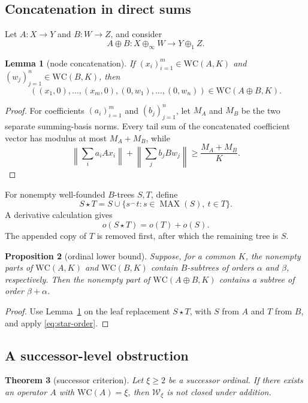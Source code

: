 \documentclass[11pt]{article}
\newtheorem{theorem}{Theorem}[section]
\newtheorem{proposition}[theorem]{Proposition}
\newtheorem{lemma}[theorem]{Lemma}
\theoremstyle{definition}
\theoremstyle{remark}
\newcommand{\WC}{\mathrm{WC}}
\newcommand{\MAX}{\operatorname{MAX}}
\newcommand{\cW}{\mathcal W}
\begin{document}
\subsection{Concatenation in direct sums}

Let $A:X\to Y$ and $B:W\to Z$, and consider
\[
   A\oplus B:X\oplus_\infty W\longrightarrow Y\oplus_1 Z.
\]

\begin{lemma}[node concatenation]\label{lem:node-concat}
If $(x_i)_{i=1}^m\in\WC(A,K)$ and $(w_j)_{j=1}^n\in\WC(B,K)$, then
\[
 ( (x_1,0),\dots,(x_m,0),(0,w_1),\dots,(0,w_n) )
 \in\WC(A\oplus B,K).
\]
\end{lemma}

\begin{proof}
For coefficients $(a_i)_{i=1}^m$ and $(b_j)_{j=1}^n$, let $M_A$ and $M_B$ be the two separate summing-basis norms.  Every tail sum of the concatenated coefficient vector has modulus at most $M_A+M_B$, while
\[
 \left\|\sum_i a_iAx_i\right\|+
 \left\|\sum_j b_jBw_j\right\|
 \geq\frac{M_A+M_B}{K}.
\]
\end{proof}

For nonempty well-founded $B$-trees $S,T$, define
\[
   S\star T=S\cup\{s^\frown t:s\in\MAX(S),\ t\in T\}.
\]
A derivative calculation gives
\begin{equation}\label{eq:star-order}
   o(S\star T)=o(T)+o(S).
\end{equation}
The appended copy of $T$ is removed first, after which the remaining tree is $S$.

\begin{proposition}[ordinal lower bound]\label{prop:direct-sum-lower}
Suppose, for a common $K$, the nonempty parts of $\WC(A,K)$ and $\WC(B,K)$ contain $B$-subtrees of orders $\alpha$ and $\beta$, respectively.  Then the nonempty part of $\WC(A\oplus B,K)$ contains a subtree of order $\beta+\alpha$.
\end{proposition}

\begin{proof}
Use Lemma~\ref{lem:node-concat} on the leaf replacement $S\star T$, with $S$ from $A$ and $T$ from $B$, and apply \eqref{eq:star-order}.
\end{proof}

\subsection{A successor-level obstruction}

\begin{theorem}[successor criterion]\label{thm:successor-fail}
Let $\xi\geq2$ be a successor ordinal.  If there exists an operator $A$ with $\WC(A)=\xi$, then $\cW_\xi$ is not closed under addition.
\end{theorem}
\end{document}
